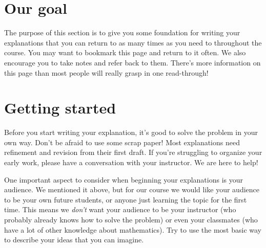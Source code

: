 \documentclass[noauthor,nooutcomes]{ximera}
\begin{document}
\section{Our goal}
The purpose of this section is to give you some foundation for writing your explanations that you can return to as many times as you need to throughout the course. You may want to bookmark this page and return to it often. We also encourage you to take notes and refer back to them. There's more information on this page than most people will really grasp in one read-through!

\section{Getting started}
Before you start writing your explanation, it's good to solve the problem in your own way. Don't be afraid to use some scrap paper! Most explanations need refinement and revision from their first draft. If you're struggling to organize your early work, please have a conversation with your instructor. We are here to help!

One important aspect to consider when beginning your explanations is your audience. We mentioned it above, but for our course we would like your audience to be your own future students, or anyone just learning the topic for the first time. This means we {\em don't} want your audience to be your instructor (who probably already knows how to solve the problem) or even your classmates (who have a lot of other knowledge about mathematics). Try to use the most basic way to describe your ideas that you can imagine.
\end{document}
